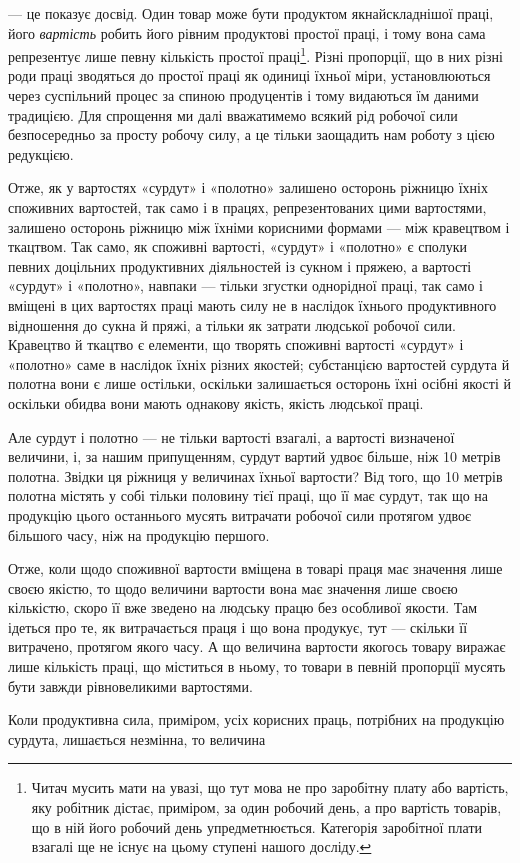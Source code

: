 — це показує досвід. Один товар може бути продуктом якнайскладнішої
праці, його \emph{вартість} робить його рівним продуктові
простої праці, і тому вона сама репрезентує лише певну кількість
простої праці\footnote{
Читач мусить мати на увазі, що тут мова не про заробітну плату
або вартість, яку робітник дістає, приміром, за один робочий день, а про
вартість товарів, що в ній його робочий день упредметнюється. Категорія
заробітної плати взагалі ще не існує на цьому ступені нашого досліду.
}. Різні пропорції, що в них різні роди праці зводяться
до простої праці як одиниці їхньої міри, установлюються
через суспільний процес за спиною продуцентів і тому видаються
їм даними традицією. Для спрощення ми далі вважатимемо всякий
рід робочої сили безпосередньо за просту робочу силу, а це
тільки заощадить нам роботу з цією редукцією.

Отже, як у вартостях «сурдут» і «полотно» залишено осторонь
ріжницю їхніх споживних вартостей, так само і в працях,
репрезентованих цими вартостями, залишено осторонь ріжницю
між їхніми корисними формами — між кравецтвом і ткацтвом.
Так само, як споживні вартості, «сурдут» і «полотно» є сполуки
певних доцільних продуктивних діяльностей із сукном і пряжею,
а вартості «сурдут» і «полотно», навпаки — тільки згустки
однорідної праці, так само і вміщені в цих вартостях праці мають
силу не в наслідок їхнього продуктивного відношення до сукна
й пряжі, а тільки як затрати людської робочої сили. Кравецтво
й ткацтво є елементи, що творять споживні вартості «сурдут»
і «полотно» саме в наслідок їхніх різних якостей; субстанцією
вартостей сурдута й полотна вони є лише остільки, оскільки залишається
осторонь їхні осібні якості й оскільки обидва вони мають
однакову якість, якість людської праці.

Але сурдут і полотно — не тільки вартості взагалі, а вартості
визначеної величини, і, за нашим припущенням, сурдут вартий
удвоє більше, ніж 10 метрів полотна. Звідки ця ріжниця у величинах
їхньої вартости? Від того, що 10 метрів полотна містять у
собі тільки половину тієї праці, що її має сурдут, так що на продукцію
цього останнього мусять витрачати робочої сили протягом
удвоє більшого часу, ніж на продукцію першого.

Отже, коли щодо споживної вартости вміщена в товарі праця
має значення лише своєю якістю, то щодо величини вартости вона
має значення лише своєю кількістю, скоро її вже зведено на людську
працю без особливої якости. Там ідеться про те, як витрачається
праця і що вона продукує, тут — скільки її витрачено,
протягом якого часу. А що величина вартости якогось товару
виражає лише кількість праці, що міститься в ньому, то товари
в певній пропорції мусять бути завжди рівновеликими вартостями.

Коли продуктивна сила, приміром, усіх корисних праць, потрібних
на продукцію сурдута, лишається незмінна, то величина
\parbreak{}  %
